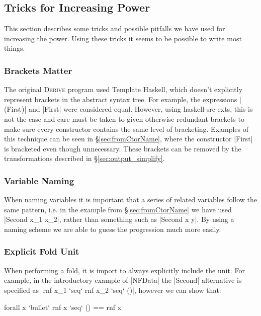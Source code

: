\documentclass[preprint,draft]{sigplanconf}
\newcommand{\derive}{\textsc{Derive}}
\begin{document}
\subsection{Tricks for Increasing Power}

This section describes some tricks and possible pitfalls we have used for increasing the power. Using these tricks it seems to be possible to write most things.

\subsubsection{Brackets Matter}

The original \derive{} program used Template Haskell, which doesn't explicitly represent brackets in the abstract syntax tree. For example, the expressions |(First)| and |First| were considered equal. However, using haskell-src-exts, this is not the case and care must be taken to given otherwise redundant brackets to make sure every constructor contains the same level of bracketing. Examples of this technique can be seen in \S\ref{sec:fromCtorName}, where the constructor |First| is bracketed even though unnecessary. These brackets can be removed by the transformations described in \S\ref{sec:output_simplify}.

\subsubsection{Variable Naming}

When naming variables it is important that a series of related variables follow the same pattern, i.e. in the example from \S\ref{sec:fromCtorName} we have used |Second x_1 x_2|, rather than something such as |Second x y|. By using a naming scheme we are able to guess the progression much more easily.

\subsubsection{Explicit Fold Unit}

When performing a fold, it is import to always explicitly include the unit. For example, in the introductory example of |NFData| the |Second| alternative is specified as |rnf x_1 `seq` rnf x_2 `seq` ()|, however we can show that:

\ignore\begin{code}
forall x `bullet` rnf x `seq` () == rnf x
\end{code}
\end{document}
